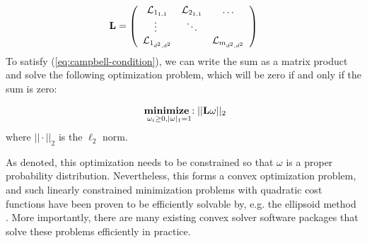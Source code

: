 \documentclass[aps,nofootinbib,pra,notitlepage,twocolumn]{revtex4-1}
\begin{document}
\begin{equation}\label{eq:vectorized_generators}
	\bold{L} = \left(\begin{array}{cccc}
		\mathcal{L}_{1_{1,1}} & \mathcal{L}_{2_{1,1}} & \ldots   \\ 
		\vdots\ & \ddots &    \\
		\mathcal{L}_{1_{d^2,d^2}} &  &  \mathcal{L}_{m_{d^2,d^2}} \\ 
	\end{array} 	
	\right)
\end{equation}
To satisfy (\ref{eq:campbell-condition}), we can write the sum as a matrix product and solve the following optimization problem, which will be zero if and only if the sum is zero:

\begin{equation}\label{eq:minimization}
  \begin{split}
    &\underset{\omega_i\geq0, |\omega|_1=1}{\textbf{minimize}: } ||\bold{L}\omega||_2\\
  \end{split}
\end{equation}
where $||\cdot||_2$ is the $\ell_2$ norm.


As denoted, this optimization needs to be constrained so that $\omega$ is a proper probability distribution. Nevertheless, this forms a convex optimization problem, and such linearly constrained minimization problems with quadratic cost functions have been proven to be efficiently solvable by, e.g. the ellipsoid method \cite{wright1999numerical, khachiyan}. More importantly, there are many existing convex solver software packages that solve these problems efficiently in practice.


\end{document}
